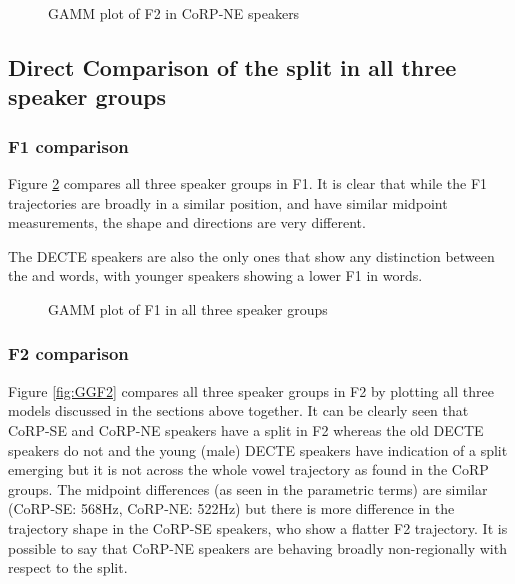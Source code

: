 \documentclass[../../../00.FullDoc/tex/Thesis]{subfiles}
\begin{document}
\begin{figure}[h]
	
	\caption{GAMM plot of F2 in CoRP-NE speakers} \label{fig:GGF2NE}
\end{figure}

\subsection{Direct Comparison of the  split in all three speaker groups} \label{subsec:GGcomparison}
\subsubsection{ F1 comparison} \label{subsubsec:GGF1all}
Figure \ref{fig:GGF1} compares all three speaker groups in F1. It is clear that while the F1 trajectories are broadly in a similar position, and have similar midpoint measurements, the shape and directions are very different. 

The DECTE speakers are also the only ones that show any distinction between the \hope{} and \hole{} words, with younger speakers showing a lower F1 in \hole{} words.

\begin{landscape}
	\vspace*{\fill}
	\begin{center}
	\begin{figure}[H]
		
		\caption{GAMM plot of F1 in all three speaker groups} \label{fig:GGF1}
	\end{figure}
	\end{center}
	\vspace*{\fill}
\end{landscape}







\subsubsection{ F2 comparison} \label{subsubsec:GGF2all}
Figure \ref{fig:GGF2} compares all three speaker groups in F2 by plotting all three models discussed in the sections above together. It can be clearly seen that CoRP-SE and CoRP-NE speakers have a \GG{} split in F2 whereas the old DECTE speakers do not and the young (male) DECTE speakers have indication of a split emerging but it is not across the whole vowel trajectory as found in the CoRP groups. The midpoint differences (as seen in the parametric terms) are similar (CoRP-SE: 568Hz, CoRP-NE: 522Hz) but there is more difference in the trajectory shape in the CoRP-SE speakers, who show a flatter F2 trajectory. It is possible to say that CoRP-NE speakers are behaving broadly non-regionally with respect to the \GG{} split.
\end{document}
